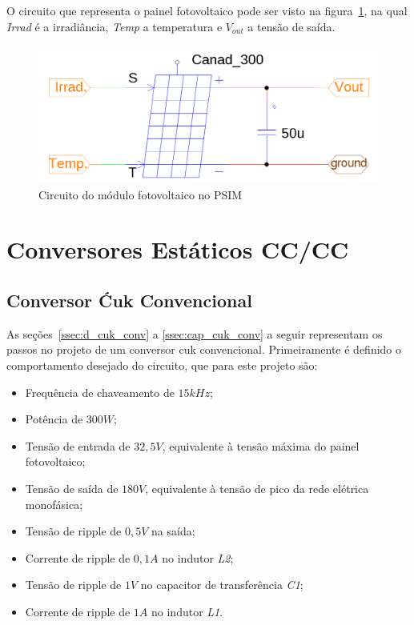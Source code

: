 \documentclass[
	12pt,				%
	openright,			%
	onseside,
	a4paper,			%
	english,			%
	french,				%
	spanish,			%
	brazil,				%
	]{abntex2}
\begin{document}
O circuito que representa o painel fotovoltaico pode ser visto na figura~\ref{fig:pv_psim_circuit}, na qual \textit{Irrad} é a irradiância, \textit{Temp} a temperatura e \emph{$V_{out}$} a tensão de saída.

\begin{figure}[]%
	\begin{center}%
		\includegraphics[width=0.55 \linewidth]{pv_psim_circuit}
		\caption{Circuito do módulo fotovoltaico no PSIM}
		\label{fig:pv_psim_circuit}
	\end{center}
\end{figure}


\section{Conversores Estáticos CC/CC}

\subsection{Conversor Ćuk Convencional}

As seções~\ref{ssec:d_cuk_conv} a \ref{ssec:cap_cuk_conv} a seguir representam os passos no projeto de um conversor cuk convencional. Primeiramente é definido o comportamento desejado do circuito, que para este projeto são:

\begin{itemize}%
	\item Frequência de chaveamento de $15kHz$;
	\item Potência de $300W$;
	\item Tensão de entrada de $32,5V$, equivalente à tensão máxima do painel fotovoltaico;
	\item Tensão de saída de $180V$, equivalente à tensão de pico da rede elétrica monofásica;
	\item Tensão de ripple de $0,5V$ na saída;
	\item Corrente de ripple de $0,1A$ no indutor \emph{L2};
	\item Tensão de ripple de $1V$ no capacitor de transferência \emph{C1};
	\item Corrente de ripple de $1A$ no indutor \emph{L1}.
\end{itemize}
\end{document}

